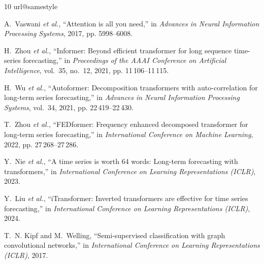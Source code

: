 \begin{thebibliography}{10}
\providecommand{\url}[1]{#1}
\csname url@samestyle\endcsname
\providecommand{\newblock}{\relax}
\providecommand{\bibinfo}[2]{#2}
\providecommand{\BIBentrySTDinterwordspacing}{\spaceskip=0pt\relax}
\providecommand{\BIBentryALTinterwordstretchfactor}{4}
\providecommand{\BIBentryALTinterwordspacing}{\spaceskip=\fontdimen2\font plus
\BIBentryALTinterwordstretchfactor\fontdimen3\font minus
  \fontdimen4\font\relax}
\providecommand{\BIBforeignlanguage}[2]{{%
\expandafter\ifx\csname l@#1\endcsname\relax
\typeout{** WARNING: IEEEtran.bst: No hyphenation pattern has been}%
\typeout{** loaded for the language `#1'. Using the pattern for}%
\typeout{** the default language instead.}%
\else
\language=\csname l@#1\endcsname
\fi
#2}}
\providecommand{\BIBdecl}{\relax}
\BIBdecl

A.~Vaswani \emph{et al.}, ``Attention is all you need,'' in \emph{Advances in Neural Information Processing Systems}, 2017, pp. 5998--6008.

H.~Zhou \emph{et al.}, ``{Informer}: Beyond efficient transformer for long sequence time-series forecasting,'' in \emph{Proceedings of the AAAI Conference on Artificial Intelligence}, vol.~35, no.~12, 2021, pp. 11\,106--11\,115.

H.~Wu \emph{et al.}, ``{Autoformer}: Decomposition transformers with auto-correlation for long-term series forecasting,'' in \emph{Advances in Neural Information Processing Systems}, vol.~34, 2021, pp. 22\,419--22\,430.

T.~Zhou \emph{et al.}, ``{FEDformer}: Frequency enhanced decomposed transformer for long-term series forecasting,'' in \emph{International Conference on Machine Learning}, 2022, pp. 27\,268--27\,286.

Y.~Nie \emph{et al.}, ``A time series is worth 64 words: Long-term forecasting with transformers,'' in \emph{International Conference on Learning Representations (ICLR)}, 2023.

Y.~Liu \emph{et al.}, ``{iTransformer}: Inverted transformers are effective for time series forecasting,'' in \emph{International Conference on Learning Representations (ICLR)}, 2024.

T.~N. Kipf and M.~Welling, ``Semi-supervised classification with graph convolutional networks,'' in \emph{International Conference on Learning Representations (ICLR)}, 2017.


\end{thebibliography}
